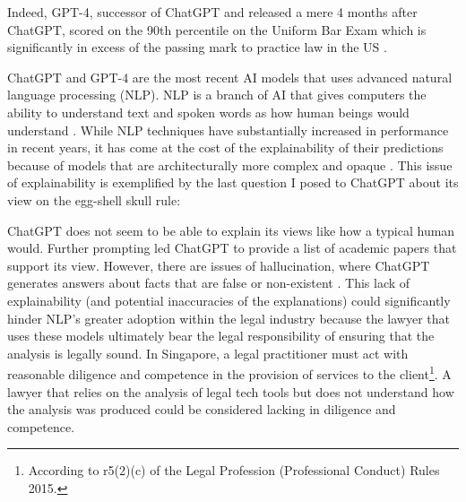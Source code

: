 \documentclass[11pt]{article}
\begin{document}

Indeed, GPT-4, successor of ChatGPT and released a mere 4 months after ChatGPT, scored on the 90th percentile on the Uniform Bar Exam which is significantly in excess of the passing mark to practice law in the US \cite{katz2023gpt}.

ChatGPT and GPT-4 are the most recent AI models that uses advanced natural language processing (NLP). NLP is a branch of AI that gives computers the ability to understand text and spoken words as how human beings would understand \cite{ibm_nlp}. While NLP techniques have substantially increased in performance in recent years, it has come at the cost of the explainability of their predictions because of models that are architecturally more complex and opaque \cite{zini2022}. This issue of explainability is exemplified by the last question I posed to ChatGPT about its view on the egg-shell skull rule:


ChatGPT does not seem to be able to explain its views like how a typical human would. Further prompting led ChatGPT to provide a list of academic papers that support its view. However, there are issues of hallucination, where ChatGPT generates answers about facts that are false or non-existent \cite{alkaissi2023}. This lack of explainability (and potential inaccuracies of the explanations) could significantly hinder NLP's greater adoption within the legal industry because the lawyer that uses these models ultimately bear the legal responsibility of ensuring that the analysis is legally sound. In Singapore, a legal practitioner must act with reasonable diligence and competence in the provision of services to the client\footnote{According to r5(2)(c) of the Legal Profession (Professional Conduct) Rules 2015.}. A lawyer that relies on the analysis of legal tech tools but does not understand how the analysis was produced could be considered lacking in diligence and competence.
\end{document}
